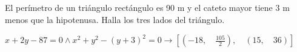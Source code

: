 \documentclass[addpoints,spanish, 12pt,a4paper]{exam}
\begin{document}
\begin{questions}
\begin{parts}
        \end{parts}
        
        
        \question[2] El perímetro de un triángulo rectángulo es 90 m y el cateto mayor tiene 3 m menos que la hipotenusa. Halla los tres lados del triángulo.
\addpoints %


\begin{solution}
 	$x + 2 y - 87 = 0\land x^{2} + y^{2} - \left(y + 3\right)^{2} = 0\to \left [ \left ( -18, \quad \frac{105}{2}\right ), \quad \left ( 15, \quad 36\right )\right ]$ 
\end{solution}



\end{questions}
\end{document}
